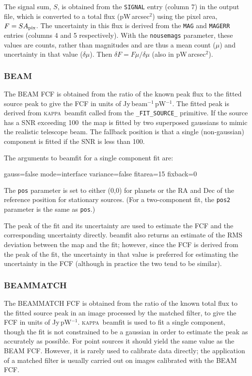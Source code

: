 \documentclass[twoside,11pt,nolof]{starlink}
\providecommand{\KAPPA}{\textsc{kappa}}
\providecommand{\task}[1]{\textsf{#1}}
\providecommand{\snrmin}{100}
\begin{document}
The signal sum, $S$, is obtained from the \verb+SIGNAL+ entry (column
7) in the output file, which is converted to a total flux
(pW\,arcsec$^2$) using the pixel area, $F = S A_{\rm pix}$. The
uncertainty in this flux is derived from the \verb+MAG+ and
\verb+MAGERR+ entries (columns 4 and 5 respectively). With the
\verb+nousemags+ parameter, these values are counts, rather than
magnitudes and are thus a mean count ($\mu$) and uncertainty in that
value ($\delta \mu$). Then $\delta F = F \mu/\delta\mu$ (also in
pW\,arcsec$^2$).

\subsubsection{BEAM}

The BEAM FCF is obtained from the ratio of the known peak flux to the
fitted source peak to give the FCF in units of
Jy\,beam$^{-1}$\,pW$^{-1}$. The fitted peak is derived from \KAPPA\
\task{beamfit} called from the \verb+_FIT_SOURCE_+ primitive. If the
source has a SNR exceeding \snrmin\ the map is fitted by two
superposed gaussians to mimic the realistic telescope beam. The
fallback position is that a single (non-gaussian) component is fitted
if the SNR is less than \snrmin.

The arguments to \task{beamfit} for a single component fit are:
\begin{terminalv}
gauss=false mode=interface variance=false fitarea=15 fixback=0
\end{terminalv}
The \verb+pos+ parameter is set to either (0,0) for planets or the RA
and Dec of the reference position for stationary sources. (For a
two-component fit, the \verb+pos2+ parameter is the same as
\verb+pos+.)

The peak of the fit and its uncertainty are used to estimate the FCF
and the corresponding uncertainty directly. \task{beamfit} also
returns an estimate of the RMS deviation between the map and the fit;
however, since the FCF is derived from the peak of the fit, the
uncertainty in that value is preferred for estimating the uncertainty
in the FCF (although in practice the two tend to be similar).

\subsubsection{BEAMMATCH}

The BEAMMATCH FCF is obtained from the ratio of the known total flux
to the fitted source peak in an image processed by the matched filter,
to give the FCF in units of Jy\,pW$^{-1}$. \KAPPA\ \task{beamfit} is
used to fit a single component, though the fit is not constrained to
be a gaussian in order to estimate the peak as accurately as
possible. For point sources it should yield the same value as the BEAM
FCF. However, it is rarely used to calibrate data directly; the
application of a matched filter is usually carried out on images
calibrated with the BEAM FCF.
\end{document}

